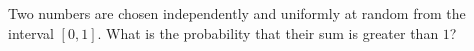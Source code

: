 Two numbers are chosen independently and uniformly at random from the interval $[0,1]$. What is the probability that their sum is greater than $1$?
